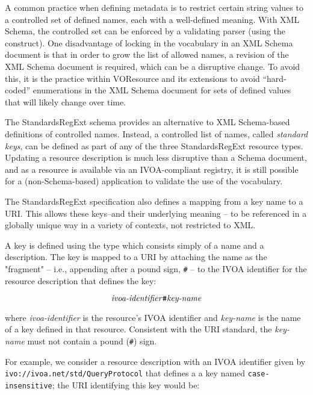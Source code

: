 \documentclass[11pt,a4paper]{ivoa}
\begin{document}
A common practice when defining metadata is to restrict
certain string values to a controlled set of defined names, each with 
a well-defined meaning.  With XML
Schema, the controlled set can be enforced by a validating parser 
(using the  construct).  
One disadvantage of locking in the
vocabulary in an XML Schema document is that in order to grow the list
of allowed names, a revision of the XML Schema document is required,
which can be a disruptive change.  To avoid this, it is the practice
within VOResource and its extensions to avoid ``hard-coded''
enumerations in the XML Schema document for sets of defined values
that will likely change over time.



The StandardsRegExt schema provides an alternative to XML Schema-based
definitions of controlled names.  Instead, a controlled list of names,
called \emph{standard keys}, can be defined as part of any of the three
StandardsRegExt resource types.  Updating a resource description is much
less disruptive than a Schema document, and as a resource is available
via an IVOA-compliant registry, it is still possible for a
(non-Schema-based) application to validate the use of the vocabulary.  



The StandardsRegExt specification also defines a mapping from a key name to
a URI.  This allows these keys--and their underlying meaning -- to be
referenced in a globally unique way in a variety of contexts, not
restricted to XML.



A key is defined using the  type which
consists simply of a name and a description.  The key is mapped to a
URI by attaching the name as the "fragment" -- i.e., appending after a
pound sign, \verb|#| -- to the IVOA identifier for the resource
description that defines the key:

$$
\hbox{\emph{ivoa-identifier}\verb|#|\emph{key-name}}
$$

where \emph{ivoa-identifier} is the resource's IVOA identifier and
\emph{key-name} is the name of a key defined in that resource.
Consistent with the URI standard, the
\emph{key-name} must not contain a pound (\verb|#|) sign.



For example, we consider a resource description with an IVOA
identifier given by 
\nolinkurl{ivo://ivoa.net/std/QueryProtocol} that
defines a a key named \texttt{case-insensitive}; the URI
identifying this key would be: 
\end{document}
